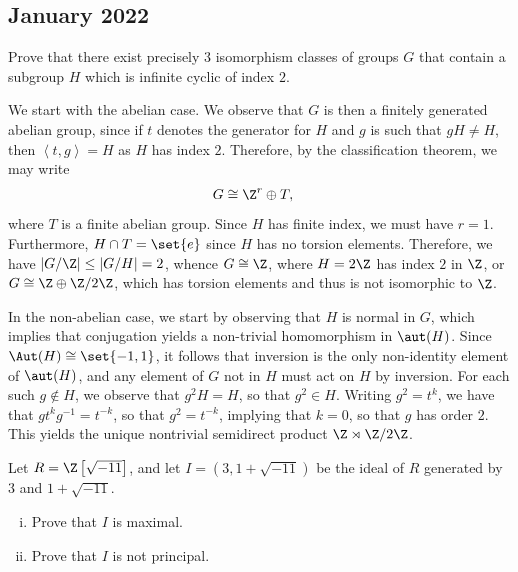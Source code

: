 \documentclass[10pt]{mypackage}
\begin{document}
\subsection{January 2022}%
\begin{problem}[Problem 2]
  Prove that there exist precisely $3$ isomorphism classes of groups $G$ that contain a subgroup $H$ which is infinite cyclic of index $2$.
\end{problem}
\begin{solution}
  We start with the abelian case. We observe that $G$ is then a finitely generated abelian group, since if $t$ denotes the generator for $H$ and $g$ is such that $gH\neq H$, then $ \left\langle t,g \right\rangle = H $ as $H$ has index $2$. Therefore, by the classification theorem, we may write
  \begin{align*}
    G &\cong \Z^{r} \oplus T,
  \end{align*}
  where $T$ is a finite abelian group. Since $H$ has finite index, we must have $r = 1$. Furthermore, $H\cap T = \set{e}$ since $H$ has no torsion elements. Therefore, we have $ \left\vert G/\Z \right\vert \leq \left\vert G/H \right\vert = 2$, whence $G \cong \Z$, where $H = 2\Z$ has index $2$ in $\Z$, or $G\cong \Z \oplus \Z/2\Z$, which has torsion elements and thus is not isomorphic to $\Z$.

  In the non-abelian case, we start by observing that $H$ is normal in $G$, which implies that conjugation yields a non-trivial homomorphism in $\aut(H)$. Since $\Aut(H)\cong \set{-1,1}$, it follows that inversion is the only non-identity element of $\aut(H)$, and any element of $G$ not in $H$ must act on $H$ by inversion. For each such $g\notin H$, we observe that $g^2H = H$, so that $g^2\in H$. Writing $g^2 = t^{k}$, we have that $gt^{k}g^{-1} = t^{-k}$, so that $g^2 = t^{-k}$, implying that $k = 0$, so that $g$ has order $2$. This yields the unique nontrivial semidirect product $\Z\rtimes \Z/2\Z$.
\end{solution}
\begin{problem}[Problem 4]
  Let $R = \Z\left[ \sqrt{-11} \right]$, and let $I = \left( 3,1 + \sqrt{-11} \right)$ be the ideal of $R$ generated by $3$ and $1 + \sqrt{-11}$.
  \begin{enumerate}[(i)]
    \item Prove that $I$ is maximal.
    \item Prove that $I$ is not principal.
  \end{enumerate}
\end{problem}
\end{document}
